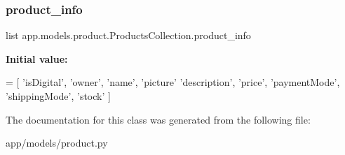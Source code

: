 \subsubsection{\texorpdfstring{product\+\_\+info}{product\_info}}
{\footnotesize\ttfamily list app.\+models.\+product.\+Products\+Collection.\+product\+\_\+info\hspace{0.3cm}{\ttfamily [static]}}

{\bfseries Initial value\+:}
\begin{DoxyCode}
=  [
        \textcolor{stringliteral}{'isDigital'},
        \textcolor{stringliteral}{'owner'},
        \textcolor{stringliteral}{'name'},
        \textcolor{stringliteral}{'picture'}
        \textcolor{stringliteral}{'description'},
        \textcolor{stringliteral}{'price'},
        \textcolor{stringliteral}{'paymentMode'},
        \textcolor{stringliteral}{'shippingMode'},
        \textcolor{stringliteral}{'stock'}
    ]
\end{DoxyCode}


The documentation for this class was generated from the following file\+:\begin{DoxyCompactItemize}
\item 
app/models/product.\+py\end{DoxyCompactItemize}
